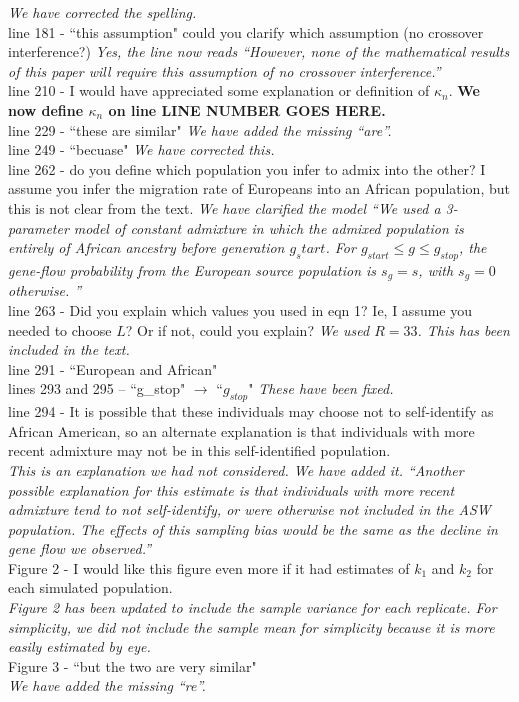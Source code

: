 \documentclass[11pt]{amsart}
\begin{document}
	\textit{We have corrected the spelling.}\\
line 181 - ``this assumption" could you clarify which assumption (no crossover
interference?)
	\textit{Yes, the line now reads ``However, none of the mathematical results of
	this paper will require this assumption of no crossover interference.''}\\
line 210 - I would have appreciated some explanation or definition of
$\kappa_n$.
	\textbf{We now define $\kappa_n$ on line LINE NUMBER GOES HERE.}\\
line 229 - ``these are similar"
	\textit{We have added the missing ``are''.}\\
line 249 - ``becuase"
	\textit{We have corrected this.}\\
line 262 - do you define which population you infer to admix into the other? I
assume you infer the migration rate of Europeans into an African population, but
 this is not clear from the text.
	\textit{We have clarified the model ``We used a 3-parameter model of constant
	admixture in which the admixed population is entirely of African ancestry
	before generation $g_start$. For $g_{start}\leq g\leq g_{stop}$, the gene-flow
	probability from the European source population is $s_g=s$, with $s_g=0$
	otherwise. ''}\\ line 263 - Did you explain which values you used in eqn 1?
	Ie, I assume you needed to choose $L$? Or if not, could you explain?
	\textit{We used $R=33$. This has been included in the text.}\\
line 291 - ``European and African"
	\\
lines 293 and 295 – ``g\_stop" $\rightarrow$ ``$g_{stop}$"
	\textit{These have been fixed.}\\
line 294 - It is possible that these individuals may choose not to self-identify
as African American, so an alternate explanation is that individuals with more
recent admixture may not be in this self-identified population. \\
	\textit{This is an explanation we had not considered. We have added it.
	``Another possible explanation for this estimate is that individuals with more
	recent admixture tend to not self-identify, or were otherwise not included in
	the ASW population. The effects of this sampling bias would be the same as the
	decline in gene flow we observed.''}\\
Figure 2 - I would like this figure even more if it had estimates of $k_1$ and
$k_2$ for each simulated population.\\
	\textit{Figure 2 has been updated to include the sample variance for each
	replicate. For simplicity, we did not include the sample mean for simplicity
	because it is more easily estimated by eye.}\\
Figure 3 - ``but the two are very similar"\\
	\textit{We have added the missing ``re''.}
\end{document}
